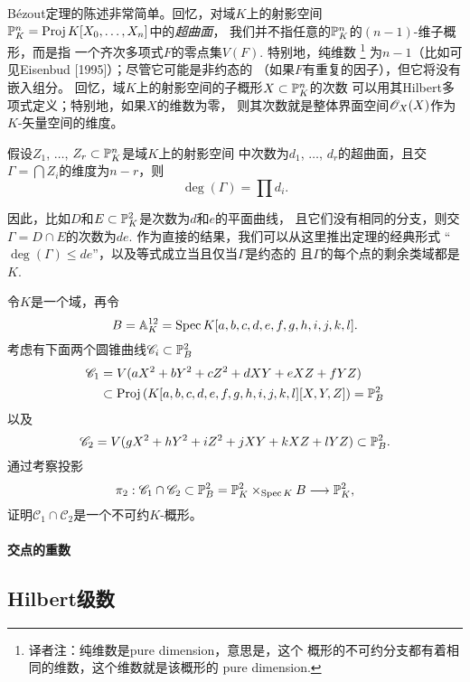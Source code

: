 
B\'ezout定理的陈述非常简单。回忆，对域$K$上的射影空间
$\P_K^n=\proj K[X_0,\dots,X_n]$中的\textit{超曲面}，
我们并不指任意的$\P_K^n$的$(n-1)$-维子概形，而是指
一个齐次多项式$F$的零点集$V(F)$. 特别地，纯维数%
\footnote{译者注：纯维数是pure dimension，意思是，这个
概形的不可约分支都有着相同的维数，这个维数就是该概形的
pure dimension.}%
为$n-1$（比如可见Eisenbud [1995]）；尽管它可能是非约态的
（如果$F$有重复的因子），但它将没有嵌入组分。
回忆，域$K$上的射影空间的子概形$X\subset \P_K^n$的次数
可以用其Hilbert多项式定义；特别地，如果$X$的维数为零，
则其次数就是整体界面空间$\oo_X(X)$作为$K$-矢量空间的维度。

\begin{thm}
\label{thm:3.71}
假设$Z_1$, $\dots$, $Z_r\subset \P_K^n$是域$K$上的射影空间
中次数为$d_1$, $\dots$, $d_r$的超曲面，且交
$\Gamma=\bigcap Z_i$的维度为$n-r$，则
\[
	\deg(\Gamma)=\prod d_i.
\]
\end{thm}

因此，比如$D$和$E\subset \P_K^2$是次数为$d$和$e$的平面曲线，
且它们没有相同的分支，则交$\Gamma=D\cap E$的次数为$de$. 
作为直接的结果，我们可以从这里推出定理的经典形式
“$\deg(\Gamma)\leq de$”，以及等式成立当且仅当$\Gamma$是约态的
且$\Gamma$的每个点的剩余类域都是$K$.


\begin{exe}\label{exe:3.73}
令$K$是一个域，再令
\[
	B=\A_K^{12}=\spec K[a,b,c,d,e,f,g,h,i,j,k,l].
\]
考虑有下面两个圆锥曲线$\mathscr C_i\subset \P_B^2$
\begin{align*}
	\mathscr C_1&=V(aX^2+bY^2+cZ^2+dXY+eXZ+fYZ)\\
	&\subset \proj\left(
	K[a,b,c,d,e,f,g,h,i,j,k,l][X,Y,Z]
	\right)=\P_B^2
\end{align*}
以及
\[
	\mathscr C_2=
	V(gX^2+hY^2+iZ^2+jXY+kXZ+lYZ)\subset \P_B^2.
\]
通过考察投影
\[
	\pi_2:\mathscr C_1\cap \mathscr C_2
	\subset \P_B^2=\P_K^2\times_{\spec K}B
	\longrightarrow \P_K^2,
\]
证明$\mathscr C_1\cap \mathscr C_2$是一个不可约$K$-概形。
\end{exe}


\paragraph*{交点的重数}


\subsection{Hilbert级数}\label{s:3.3.6}

